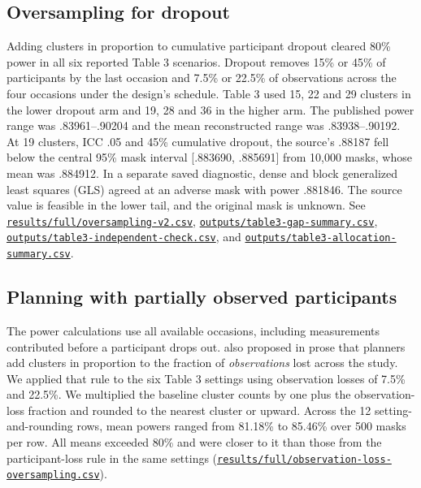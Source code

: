 \subsection{Oversampling for dropout}\label{sec:oversample}
Adding clusters in proportion to cumulative participant dropout cleared 80\% power in all six reported Table 3 scenarios. Dropout removes 15\% or 45\% of participants by the last occasion and 7.5\% or 22.5\% of observations across the four occasions under the design's schedule. Table 3 used 15, 22 and 29 clusters in the lower dropout arm and 19, 28 and 36 in the higher arm. The published power range was .83961--.90204 and the mean reconstructed range was .83938--.90192. At 19 clusters, ICC .05 and 45\% cumulative dropout, the source's .88187 fell below the central 95\% mask interval [.883690, .885691] from 10,000 masks, whose mean was .884912. In a separate saved diagnostic, dense and block generalized least squares (GLS) agreed at an adverse mask with power .881846. The source value is feasible in the lower tail, and the original mask is unknown. See \href{https://github.com/alectionary/vibe-math/blob/master/formalization/kupzyk-power-assumptions/results/full/oversampling-v2.csv}{\nolinkurl{results/full/oversampling-v2.csv}}, \href{https://github.com/alectionary/vibe-math/blob/master/formalization/kupzyk-power-assumptions/outputs/table3-gap-summary.csv}{\nolinkurl{outputs/table3-gap-summary.csv}}, \href{https://github.com/alectionary/vibe-math/blob/master/formalization/kupzyk-power-assumptions/outputs/table3-independent-check.csv}{\nolinkurl{outputs/table3-independent-check.csv}}, and \href{https://github.com/alectionary/vibe-math/blob/master/formalization/kupzyk-power-assumptions/outputs/table3-allocation-summary.csv}{\nolinkurl{outputs/table3-allocation-summary.csv}}.
\label{dis:table3-mask-tail}

\subsection{Planning with partially observed participants}\label{sec:partial}
The power calculations use all available occasions, including measurements contributed before a participant drops out. \citet[pp.~94--95, 99--100]{kupzyk2011} also proposed in prose that planners add clusters in proportion to the fraction of \emph{observations} lost across the study. We applied that rule to the six Table 3 settings using observation losses of 7.5\% and 22.5\%. We multiplied the baseline cluster counts by one plus the observation-loss fraction and rounded to the nearest cluster or upward. Across the 12 setting-and-rounding rows, mean powers ranged from 81.18\% to 85.46\% over 500 masks per row. All means exceeded 80\% and were closer to it than those from the participant-loss rule in the same settings (\href{https://github.com/alectionary/vibe-math/blob/master/formalization/kupzyk-power-assumptions/results/full/observation-loss-oversampling.csv}{\nolinkurl{results/full/observation-loss-oversampling.csv}}).

